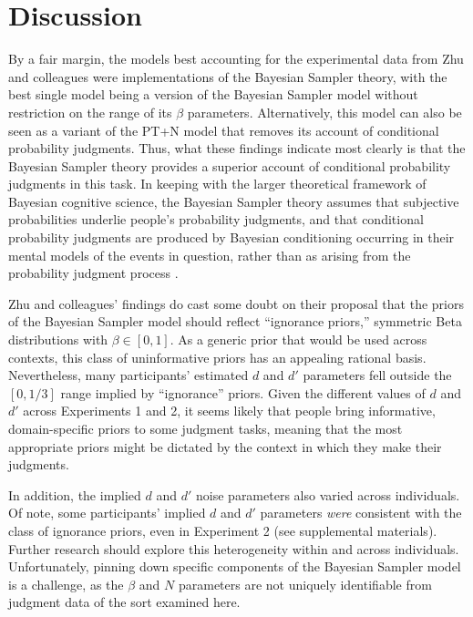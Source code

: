 \documentclass[
  english,
  man,floatsintext]{apa6}
\begin{document}
\hypertarget{discussion}{%
\section{Discussion}\label{discussion}}

By a fair margin, the models best accounting for the experimental data from Zhu and colleagues \autocite*{zhu.etal2020} were implementations of the Bayesian Sampler theory, with the best single model being a version of the Bayesian Sampler model without restriction on the range of its \(\beta\) parameters. Alternatively, this model can also be seen as a variant of the PT+N model that removes its account of conditional probability judgments. Thus, what these findings indicate most clearly is that the Bayesian Sampler theory provides a superior account of conditional probability judgments in this task. In keeping with the larger theoretical framework of Bayesian cognitive science, the Bayesian Sampler theory assumes that subjective probabilities underlie people's probability judgments, and that conditional probability judgments are produced by Bayesian conditioning occurring in their mental models of the events in question, rather than as arising from the probability judgment process \autocite{chater.etal2020,zhu.etal2020}.

Zhu and colleagues' findings do cast some doubt on their proposal that the priors of the Bayesian Sampler model should reflect ``ignorance priors,'' symmetric Beta distributions with \(\beta \in [0, 1]\). As a generic prior that would be used across contexts, this class of uninformative priors has an appealing rational basis. Nevertheless, many participants' estimated \(d\) and \(d'\) parameters fell outside the \([0, 1/3]\) range implied by ``ignorance'' priors. Given the different values of \(d\) and \(d'\) across Experiments 1 and 2, it seems likely that people bring informative, domain-specific priors to some judgment tasks, meaning that the most appropriate priors might be dictated by the context in which they make their judgments.

In addition, the implied \(d\) and \(d'\) noise parameters also varied across individuals. Of note, some participants' implied \(d\) and \(d'\) parameters \emph{were} consistent with the class of ignorance priors, even in Experiment 2 (see supplemental materials). Further research should explore this heterogeneity within and across individuals. Unfortunately, pinning down specific components of the Bayesian Sampler model is a challenge, as the \(\beta\) and \(N\) parameters are not uniquely identifiable from judgment data of the sort examined here.
\end{document}
